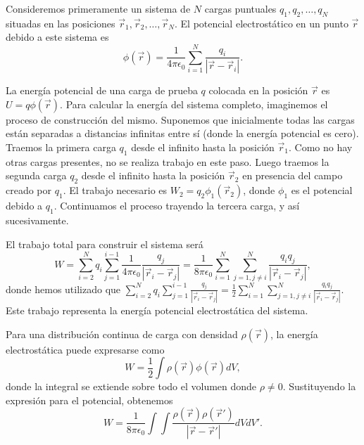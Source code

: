 \documentclass[12pt,a4paper]{book}
\begin{document}
Consideremos primeramente un sistema de $N$ cargas puntuales $q_1, q_2, \ldots, q_N$ situadas en las posiciones $\vec{r}_1, \vec{r}_2, \ldots, \vec{r}_N$. El potencial electrostático en un punto $\vec{r}$ debido a este sistema es
\begin{equation}
\phi(\vec{r}) = \frac{1}{4\pi\epsilon_0} \sum_{i=1}^{N} \frac{q_i}{|\vec{r} - \vec{r}_i|}.
\end{equation}

La energía potencial de una carga de prueba $q$ colocada en la posición $\vec{r}$ es $U = q\phi(\vec{r})$. Para calcular la energía del sistema completo, imaginemos el proceso de construcción del mismo. Suponemos que inicialmente todas las cargas están separadas a distancias infinitas entre sí (donde la energía potencial es cero). Traemos la primera carga $q_1$ desde el infinito hasta la posición $\vec{r}_1$. Como no hay otras cargas presentes, no se realiza trabajo en este paso. Luego traemos la segunda carga $q_2$ desde el infinito hasta la posición $\vec{r}_2$ en presencia del campo creado por $q_1$. El trabajo necesario es $W_2 = q_2\phi_1(\vec{r}_2)$, donde $\phi_1$ es el potencial debido a $q_1$. Continuamos el proceso trayendo la tercera carga, y así sucesivamente.

El trabajo total para construir el sistema será
\begin{equation}
W = \sum_{i=2}^{N} q_i \sum_{j=1}^{i-1} \frac{1}{4\pi\epsilon_0} \frac{q_j}{|\vec{r}_i - \vec{r}_j|} = \frac{1}{8\pi\epsilon_0} \sum_{i=1}^{N} \sum_{j=1, j\neq i}^{N} \frac{q_i q_j}{|\vec{r}_i - \vec{r}_j|},
\end{equation}
donde hemos utilizado que $\sum_{i=2}^{N} q_i \sum_{j=1}^{i-1} \frac{q_j}{|\vec{r}_i - \vec{r}_j|} = \frac{1}{2} \sum_{i=1}^{N} \sum_{j=1, j\neq i}^{N} \frac{q_i q_j}{|\vec{r}_i - \vec{r}_j|}$. Este trabajo representa la energía potencial electrostática del sistema.

Para una distribución continua de carga con densidad $\rho(\vec{r})$, la energía electrostática puede expresarse como
\begin{equation}
W = \frac{1}{2} \int \rho(\vec{r}) \phi(\vec{r}) dV,
\end{equation}
donde la integral se extiende sobre todo el volumen donde $\rho \neq 0$. Sustituyendo la expresión para el potencial, obtenemos
\begin{equation}
W = \frac{1}{8\pi\epsilon_0} \int\int \frac{\rho(\vec{r})\rho(\vec{r}')}{|\vec{r} - \vec{r}'|} dV dV'.
\end{equation}
\end{document}
